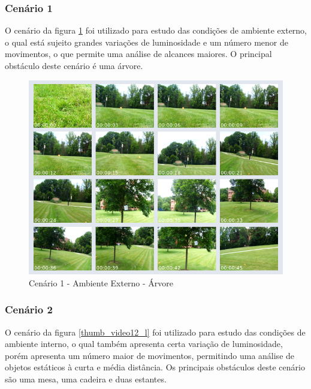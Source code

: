 \subsubsection{Cenário 1}

O cenário da figura \ref{thumb_video10_l} foi utilizado para estudo das condições de ambiente externo, o qual está sujeito grandes variações de luminosidade e um número menor de movimentos, o que permite uma análise de alcances maiores. O principal  obstáculo deste cenário é uma árvore. 

\begin{figure}[H]
 	\centering
 	\includegraphics[scale=0.50]{./Resources/thumb_video10_l.png}
 	\caption{Cenário 1 - Ambiente Externo - Árvore}
 	\label{thumb_video10_l}
\end{figure}

\subsubsection{Cenário 2}

O cenário da figura \ref{thumb_video12_l} foi utilizado para estudo das condições de ambiente interno, o qual também apresenta certa variação de luminosidade, porém apresenta um número maior de movimentos, permitindo uma análise de objetos estáticos à curta e média distância. Os principais obstáculos deste cenário são uma mesa, uma cadeira e duas estantes.

